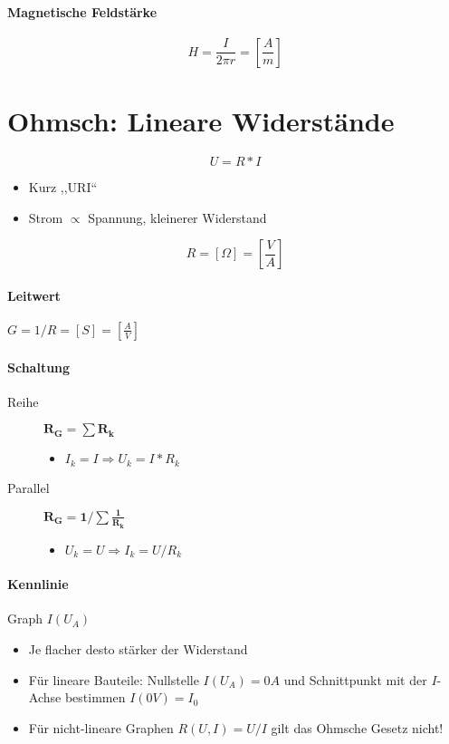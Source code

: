 \paragraph{Magnetische Feldstärke}

$$H = \frac{I}{2\pi r} = \left[\frac{A}{m}\right]$$

\section{Ohmsch: Lineare Widerstände}

$$U = R * I$$

\begin{itemize}
  \item Kurz ,,URI``
  \item Strom $\propto$ Spannung, kleinerer Widerstand
\end{itemize}

$$R = [\Omega] = \left[\frac{V}{A}\right]$$

\paragraph{Leitwert} $G = 1/R = [S] = \left[\frac{A}{V}\right]$

\paragraph{Schaltung}

\begin{description}
  \item[Reihe] $\mathbf{R_G = \sum R_k}$
    \begin{itemize}
      \item $I_k = I \Rightarrow U_k = I * R_k$
    \end{itemize}

  \item[Parallel] $\mathbf{R_G = 1 / \sum \frac{1}{R_k}}$
    \begin{itemize}
      \item $U_k = U \Rightarrow I_k = U/R_k$
    \end{itemize}
\end{description}

\paragraph{Kennlinie} Graph $I(U_A)$

\begin{itemize}
  \item Je flacher desto stärker der Widerstand
  \item Für lineare Bauteile: Nullstelle $I(U_A) = 0A$ und Schnittpunkt mit der $I$-Achse bestimmen $I(0V) = I_0$
  \item Für nicht-lineare Graphen $R(U, I) = U/I$ gilt das Ohmsche Gesetz nicht!
\end{itemize}

